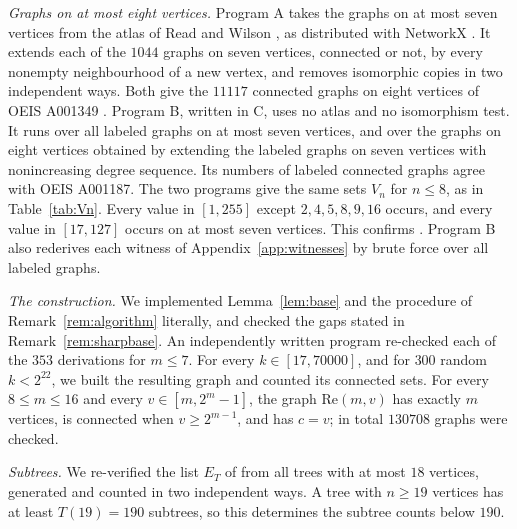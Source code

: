 \documentclass[11pt]{amsart}
\theoremstyle{definition}
\theoremstyle{remark}
\newcommand{\Tr}[1]{T(#1)}
\begin{document}
\emph{Graphs on at most eight vertices.} Program A takes the graphs on at most seven vertices from the atlas of Read and Wilson \cite{RW}, as distributed with NetworkX \cite{NX}. It extends each of the $1044$ graphs on seven vertices, connected or not, by every nonempty neighbourhood of a new vertex, and removes isomorphic copies in two independent ways. Both give the $11117$ connected graphs on eight vertices of OEIS A001349 \cite{OEIS}. Program B, written in C, uses no atlas and no isomorphism test. It runs over all labeled graphs on at most seven vertices, and over the graphs on eight vertices obtained by extending the labeled graphs on seven vertices with nonincreasing degree sequence. Its numbers of labeled connected graphs agree with OEIS A001187. The two programs give the same sets $V_n$ for $n\le8$, as in Table~\ref{tab:Vn}. Every value in $[1,255]$ except $2,4,5,8,9,16$ occurs, and every value in $[17,127]$ occurs on at most seven vertices. This confirms \cite[Remark~3.20]{CORa}. Program B also rederives each witness of Appendix~\ref{app:witnesses} by brute force over all labeled graphs.

\emph{The construction.} We implemented Lemma~\ref{lem:base} and the procedure of Remark~\ref{rem:algorithm} literally, and checked the gaps stated in Remark~\ref{rem:sharpbase}. An independently written program re-checked each of the $353$ derivations for $m\le7$. For every $k\in[17,70000]$, and for $300$ random $k<2^{22}$, we built the resulting graph and counted its connected sets. For every $8\le m\le16$ and every $v\in[m,2^m-1]$, the graph $\mathrm{Re}(m,v)$ has exactly $m$ vertices, is connected when $v\ge2^{m-1}$, and has $c=v$; in total $130708$ graphs were checked.

\emph{Subtrees.} We re-verified the list $E_T$ of \cite{CSW} from all trees with at most $18$ vertices, generated and counted in two independent ways. A tree with $n\ge19$ vertices has at least $\Tr{19}=190$ subtrees, so this determines the subtree counts below $190$.
\end{document}
